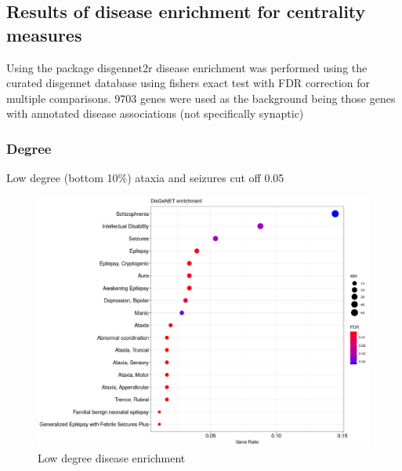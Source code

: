  



\subsection{Results of disease enrichment for centrality measures}

Using the package disgennet2r disease enrichment was performed using the curated disgennet database using fishers exact test with FDR correction for multiple comparisons. 9703 genes were used as the background being those genes with annotated disease associations (not specifically synaptic)
\subsubsection{Degree}

Low degree (bottom 10\%) ataxia and seizures cut off 0.05

\begin{figure}
    \centering
    \includegraphics[width=\textwidth]{images/Rplot_low_deg_0.05cutoff_0.1cent_disgen.png}
    \caption{Low degree disease enrichment}
    \label{fig:low degree disease enrichment cut off 0.05}
\end{figure}


